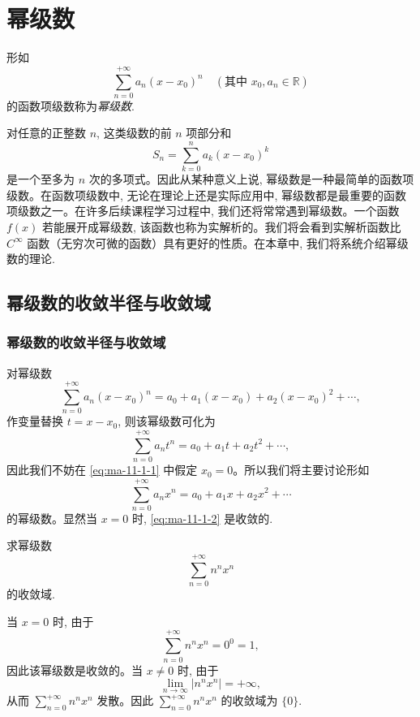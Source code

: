 \setcounter{chapter}{10} %
\chapter{幂级数}
\label{chap:ma-11}

形如
\[
  \sum_{n=0}^{+\infty}a_n(x-x_0)^n
  \quad(\text{其中 }x_0,a_n\in\mathbb R)
\]
的函数项级数称为\emph{幂级数}.

对任意的正整数 $n$, 这类级数的前 $n$ 项部分和
\[
  S_n=\sum_{k=0}^{n}a_k(x-x_0)^k
\]
是一个至多为 $n$ 次的多项式。因此从某种意义上说, 幂级数是一种最简单的函数项级数。在函数项级数中, 无论在理论上还是实际应用中, 幂级数都是最重要的函数项级数之一。在许多后续课程学习过程中, 我们还将常常遇到幂级数。一个函数 $f(x)$ 若能展开成幂级数, 该函数也称为实解析的。我们将会看到实解析函数比 $C^\infty$ 函数（无穷次可微的函数）具有更好的性质。在本章中, 我们将系统介绍幂级数的理论.

\section{幂级数的收敛半径与收敛域}
\label{sec:ma-11-1}

\subsection{幂级数的收敛半径与收敛域}
\label{subsec:ma-11-1-1}

对幂级数
\begin{equation}
  \sum_{n=0}^{+\infty}a_n(x-x_0)^n
  =a_0+a_1(x-x_0)+a_2(x-x_0)^2+\cdots ,
  \label{eq:ma-11-1-1}
\end{equation}
作变量替换 $t=x-x_0$, 则该幂级数可化为
\[
  \sum_{n=0}^{+\infty}a_nt^n=a_0+a_1t+a_2t^2+\cdots ,
\]
因此我们不妨在 \eqref{eq:ma-11-1-1} 中假定 $x_0=0$。所以我们将主要讨论形如
\begin{equation}
  \sum_{n=0}^{+\infty}a_nx^n=a_0+a_1x+a_2x^2+\cdots
  \label{eq:ma-11-1-2}
\end{equation}
的幂级数。显然当 $x=0$ 时, \eqref{eq:ma-11-1-2} 是收敛的.

\begin{example}\label{example:ma-11-1-1}
求幂级数
\[
  \sum_{n=0}^{+\infty}n^nx^n
\]
的收敛域.
\end{example}


\begin{solve}
当 $x=0$ 时, 由于
\[
  \sum_{n=0}^{+\infty}n^nx^n=0^0=1,
\]
因此该幂级数是收敛的。当 $x\ne0$ 时, 由于
\[
  \lim_{n\to\infty}|n^nx^n|=+\infty,
\]
从而 $\sum_{n=0}^{+\infty}n^nx^n$ 发散。因此 $\sum_{n=0}^{+\infty}n^nx^n$ 的收敛域为 $\{0\}$.
\end{solve}


